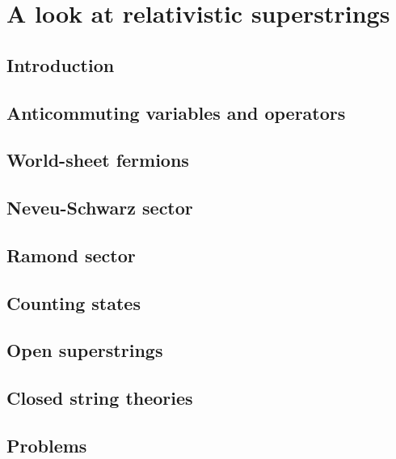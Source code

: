 \documentclass[12pt]{report}
\begin{document}
\chapter{A look at relativistic superstrings}
\newpage
\section{Introduction}
\section{Anticommuting variables and operators}
\section{World-sheet fermions}
\section{Neveu-Schwarz sector}
\section{Ramond sector}
\section{Counting states}
\section{Open superstrings}
\section{Closed string theories}
\section{Problems}
\end{document}
